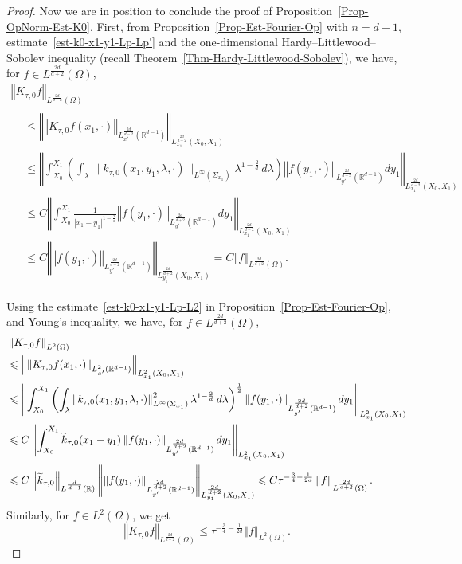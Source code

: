 \documentclass[AHL,Unicode,longabstracts]{cedram}
\newcommand*\R{\mathbb{R}}
\newcommand{\norm}[1]{\left\Vert#1\right\Vert}
\renewcommand{\leq}{\leqslant}
\renewcommand{\tilde}{\widetilde}
\let\oldtilde\tilde
\renewcommand*{\tilde}[1]{\mathchoice{\widetilde{#1}}{\widetilde{#1}}{\oldtilde{#1}}{\oldtilde{#1}}}
\begin{document}
\begin{proof}
Now we are in position to conclude the proof of Proposition~\ref{Prop-OpNorm-Est-K0}. First, from Proposition~\ref{Prop-Est-Fourier-Op} with $n = d-1$, estimate~\eqref{est-k0-x1-y1-Lp-Lp'} and the one-dimensional Hardy--Littlewood--Sobolev inequality (recall Theorem~\ref{Thm-Hardy-Littlewood-Sobolev}), we have, for $f \in L^{\frac{2d}{d+2}}(\Omega)$,
\begin{multline*}
\norm{ K_{\tau, 0} f }_{L^{\frac{2d}{d-2}}(\Omega)}\\
\begin{aligned}
&\leq
\norm{ \norm{ K_{\tau, 0} f(x_1, \cdot) }_{L_{x'}^{\frac{2d}{d-2}}(\R^{d-1})}}_{L_{x_1}^{\frac{2d}{d-2}}(X_0,X_1)}
\\
&\leq
\norm{ \int_{X_0}^{X_1} \left(\int_{\lambda} \| k_{\tau, 0}(x_1, y_1, \lambda,\cdot)\|_{L^\infty(\Sigma_{x_1}) } \lambda^{1 - \frac{2}{d}} \, d\lambda\right) \norm{ f(y_1, \cdot)}_{L_{y'}^{\frac{2d}{d+2}}(\R^{d-1}) } d y_1 }_{L_{x_1}^{\frac{2d}{d-2}}(X_0,X_1)}
\\
&\leq C
\norm{ \int_{X_0}^{X_1} \frac{1}{|x_1 - y_1|^{1-\frac{2}{d}}} \norm{ f(y_1, \cdot)}_{L_{y'}^{\frac{2d}{d+2}}(\R^{d-1}) } d y_1 }_{L_{x_1}^{\frac{2d}{d-2}}(X_0,X_1)}
\\
&\leq C \norm{ \norm{ f(y_1, \cdot)}_{L_{y'}^{\frac{2d}{d+2}}(\R^{d-1}) }}_{L_{y_1}^{\frac{2d}{d+2}}(X_0,X_1)} = C \norm{f}_{L^{\frac{2d}{d+2}}(\Omega)}.
\end{aligned}
\end{multline*}

Using the estimate~\eqref{est-k0-x1-y1-Lp-L2} in Proposition~\ref{Prop-Est-Fourier-Op}, and Young's inequality, we have, for $f \in L^{\frac{2d}{d+2}}(\Omega)$,
\begingroup
\allowdisplaybreaks
\begin{align*}
&\norm{K_{\tau, 0} f}_{L^{2}(\Omega)}\\
&\leq
\norm{ \norm{ K_{\tau, 0} f(x_1, \cdot) }_{L_{x'}^{2}\left(\R^{d-1}\right)}}_{L_{x_1}^{2}(X_0, X_1)}
\\
&
\leq
\norm{ \int_{X_0}^{X_1} \left(\int_{\lambda} \left\| k_{\tau, 0}(x_1, y_1, \lambda,\cdot)\right\|^2_{L^\infty(\Sigma_{x_1}) } \lambda^{1 - \frac{2}{d}} \, d\lambda\right)^{\frac{1}{2}} \norm{ f(y_1, \cdot)}_{L_{y'}^{\frac{2d}{d+2}}(\R^{d-1}) }d y_1}_{L_{x_1}^{2}(X_0,X_1)}
\\
&\leq C
\norm{ \int_{X_0}^{X_1} \tilde k_{\tau,0}(x_1 -y_1) \norm{ f(y_1, \cdot)}_{L_{y'}^{\frac{2d}{d+2}}\left(\R^{d-1}\right)}d y_1 }_{L_{x_1}^{2}(X_0,X_1)}
\\
& \leq C \norm{\tilde k_{\tau,0}}_{L^{\frac{d}{d-1}}(\R)} \norm{ \norm{ f(y_1, \cdot)}_{L_{y'}^{\frac{2d}{d+2}}\left(\R^{d-1}\right)}}_{L_{y_1}^{\frac{2d}{d+2}}(X_0,X_1)} \leq C\tau^{-\frac{3}{4}-\frac{1}{2d}} \norm{f}_{L^{\frac{2d}{d+2}}(\Omega)}.
\end{align*}
\endgroup
Similarly, for $f \in L^{2}(\Omega)$, we get
\begin{equation}\label{Est-K-tau-0-L2-L2_*'}
\norm{ K_{\tau, 0} f}_{L^{\frac{2d}{d-2}}(\Omega)}
\leq
\tau^{-\frac{3}{4}-\frac{1}{2d}} \norm{f}_{L^{2}(\Omega)}.
\end{equation}


\end{proof}
\end{document}
